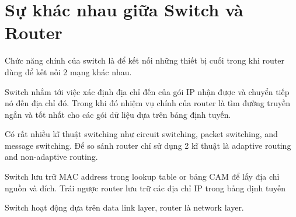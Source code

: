 \documentclass[12pt]{article}
\begin{document}
    \section*{Sự khác nhau giữa Switch và Router}
    \begin{flushleft}
    Chức năng chính của switch là để kết nối những thiết bị cuối trong
    khi router dùng để kết nối 2 mạng khác nhau. 

    Switch nhắm tới việc xác định địa chỉ đến của gói IP nhận được và
    chuyển tiếp nó đến địa chỉ đó. Trong khi đó nhiệm vụ chính của router là
    tìm đường truyền ngắn và tốt nhất cho các gói dữ liệu dựa trên bảng định tuyến.

    Có rất nhiều kĩ thuật switching như circuit switching, packet switching, 
    and message switching. Để so sánh router chỉ sử dụng 2 kĩ thuật là adaptive routing
    and non-adaptive routing.

    Switch lưu trữ MAC address trong lookup table or bảng CAM để lấy địa chỉ
    nguồn và đích. Trái ngược router lưu trữ các địa chỉ IP trong bảng định tuyến

    Switch hoạt động dựa trên data link layer, router là network layer. 
    \end{flushleft}
    
\end{document}
